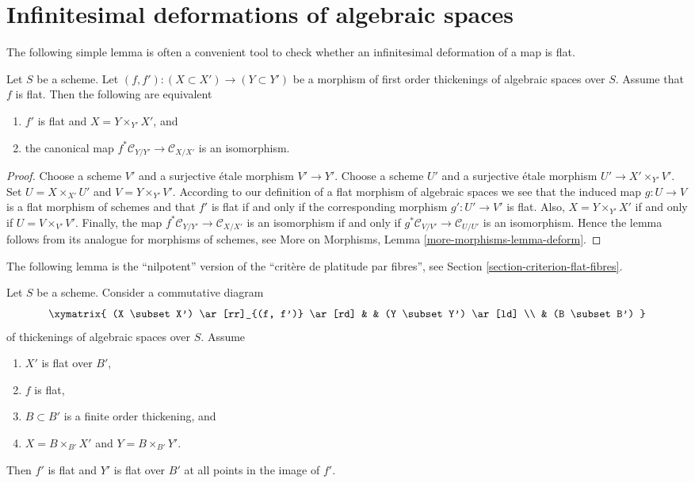 \section{Infinitesimal deformations of algebraic spaces}
\label{section-deform}

\noindent
The following simple lemma is often a convenient tool to check whether
an infinitesimal deformation of a map is flat.

\begin{lemma}
\label{lemma-deform}
Let $S$ be a scheme. Let $(f, f') : (X \subset X') \to (Y \subset Y')$ be a
morphism of first order thickenings of algebraic spaces over $S$. Assume that
$f$ is flat. Then the following are equivalent
\begin{enumerate}
\item $f'$ is flat and $X = Y \times_{Y'} X'$, and
\item the canonical map $f^*\mathcal{C}_{Y/Y'} \to \mathcal{C}_{X/X'}$
is an isomorphism.
\end{enumerate}
\end{lemma}

\begin{proof}
Choose a scheme $V'$ and a surjective \'etale morphism $V' \to Y'$.
Choose a scheme $U'$ and a surjective \'etale morphism
$U' \to X' \times_{Y'} V'$. Set $U = X \times_{X'} U'$ and
$V = Y \times_{Y'} V'$. According to our definition of a flat morphism
of algebraic spaces we see that the induced map $g : U \to V$ is a flat
morphism of schemes and that $f'$ is flat if and only if the corresponding
morphism $g' : U' \to V'$ is flat. Also, $X = Y \times_{Y'} X'$ if and only
if $U = V \times_{V'} V'$. Finally, the map
$f^*\mathcal{C}_{Y/Y'} \to \mathcal{C}_{X/X'}$
is an isomorphism if and only if
$g^*\mathcal{C}_{V/V'} \to \mathcal{C}_{U/U'}$ is an isomorphism.
Hence the lemma follows from its analogue for morphisms of schemes, see
More on Morphisms, Lemma \ref{more-morphisms-lemma-deform}.
\end{proof}

\noindent
The following lemma is the ``nilpotent'' version of the
``crit\`ere de platitude par fibres'', see
Section \ref{section-criterion-flat-fibres}.

\begin{lemma}
\label{lemma-flatness-morphism-thickenings}
Let $S$ be a scheme. Consider a commutative diagram
$$
\xymatrix{
(X \subset X') \ar[rr]_{(f, f')} \ar[rd] & & (Y \subset Y') \ar[ld] \\
& (B \subset B')
}
$$
of thickenings of algebraic spaces over $S$. Assume
\begin{enumerate}
\item $X'$ is flat over $B'$,
\item $f$ is flat,
\item $B \subset B'$ is a finite order thickening, and
\item $X = B \times_{B'} X'$ and $Y = B \times_{B'} Y'$.
\end{enumerate}
Then $f'$ is flat and $Y'$ is flat over $B'$ at all points in
the image of $f'$.
\end{lemma}

